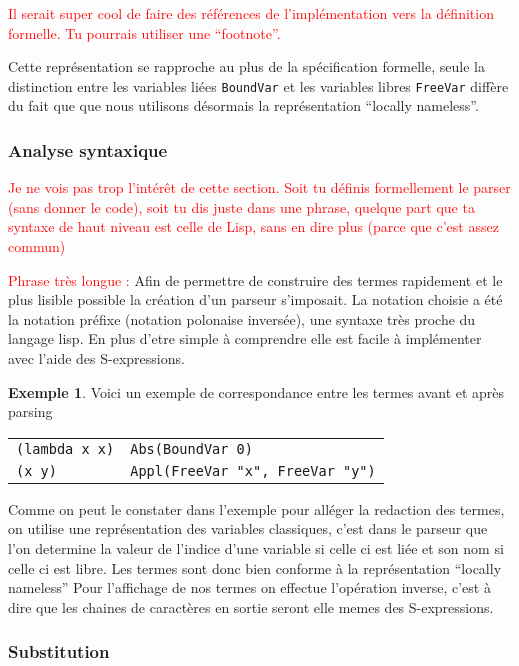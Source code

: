 \documentclass {article}
\theoremstyle{definition}
\newtheorem{example}{Exemple}
\theoremstyle{remark}
\newcommand{\todo}[1]{\textcolor{red}{#1}}
\begin{document}
\todo{Il serait super cool de faire des références de l'implémentation
  vers la définition formelle. Tu pourrais utiliser une ``footnote''.}

Cette représentation se rapproche au plus de la spécification
formelle, seule la distinction entre les variables liées \lstinline!BoundVar! et les
variables libres \lstinline!FreeVar! diffère du fait que que nous utilisons désormais 
la représentation ``locally nameless''.


\subsubsection{Analyse syntaxique}
\label{arsing}
\todo{Je ne vois pas trop l'intérêt de cette section. Soit tu définis
  formellement le parser (sans donner le code), soit tu dis juste dans
  une phrase, quelque part que ta syntaxe de haut niveau est celle de
  Lisp, sans en dire plus (parce que c'est assez commun)}

\todo{Phrase très longue :}
Afin de permettre de construire des termes rapidement et le plus lisible 
possible la création d'un parseur s'imposait.
La notation choisie a été la notation préfixe (notation polonaise inversée),
une syntaxe très proche du langage lisp. En plus d'etre simple à comprendre
elle est facile à implémenter avec l'aide des S-expressions.

\begin{example}
  Voici un exemple de correspondance entre les termes avant et après parsing
  \begin{tabular}{ll}
    \lstinline!(lambda x x)! & \lstinline!Abs(BoundVar 0)! \\
    \lstinline!(x y)! & \lstinline!Appl(FreeVar "x", FreeVar "y")!
  \end{tabular}
\end{example}

Comme on peut le constater dans l'exemple pour alléger la redaction des termes,
on utilise une représentation des variables classiques, c'est dans le parseur que 
l'on determine la valeur de l'indice d'une variable si celle ci est liée et son 
nom si celle ci est libre. Les termes sont donc bien conforme à la 
représentation ``locally nameless''
Pour l'affichage de nos termes on effectue l'opération inverse, c'est à dire que
les chaines de caractères en sortie seront elle memes des S-expressions.

\subsubsection{Substitution}
\end{document}
